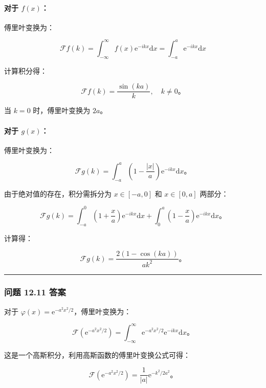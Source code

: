 \paragraph{\texorpdfstring{对于
\(f(x)\)：}{对于 f(x)：}}\label{ux5bf9ux4e8e-fx}

傅里叶变换为：

\[
\mathcal{F}f(k) = \int_{-\infty}^\infty f(x) \mathrm{e}^{-i k x} \mathrm{d}x = \int_{-a}^a \mathrm{e}^{-i k x} \mathrm{d}x
\]

计算积分得：

\[
\mathcal{F}f(k) = \frac{\sin(ka)}{k}, \quad k \neq 0。
\]

当 \(k = 0\) 时，傅里叶变换为 \(2a\)。

\paragraph{\texorpdfstring{对于
\(g(x)\)：}{对于 g(x)：}}\label{ux5bf9ux4e8e-gx}

傅里叶变换为：

\[
\mathcal{F}g(k) = \int_{-a}^a \left(1 - \frac{|x|}{a}\right) \mathrm{e}^{-i k x} \mathrm{d}x。
\]

由于绝对值的存在，积分需拆分为 \(x \in [-a, 0]\) 和 \(x \in [0, a]\)
两部分：

\[
\mathcal{F}g(k) = \int_{-a}^0 \left(1 + \frac{x}{a}\right) \mathrm{e}^{-i k x} \mathrm{d}x + \int_{0}^a \left(1 - \frac{x}{a}\right) \mathrm{e}^{-i k x} \mathrm{d}x。
\]

计算得：

\[
\mathcal{F}g(k) = \frac{2(1 - \cos(ka))}{a k^2}。
\]

\begin{center}\rule{0.5\linewidth}{0.5pt}\end{center}

\subsubsection{问题 12.11 答案}\label{ux95eeux9898-12.11-ux7b54ux6848}

对于 \(\varphi(x) = \mathrm{e}^{-a^2 x^2 / 2}\)，傅里叶变换为：

\[
\mathcal{F}\left(\mathrm{e}^{-a^2 x^2 / 2}\right) = \int_{-\infty}^\infty \mathrm{e}^{-a^2 x^2 / 2} \mathrm{e}^{-i k x} \mathrm{d}x。
\]

这是一个高斯积分，利用高斯函数的傅里叶变换公式可得：

\[
\mathcal{F}\left(\mathrm{e}^{-a^2 x^2 / 2}\right) = \frac{1}{|a|} \mathrm{e}^{-k^2 / 2a^2}。
\]

